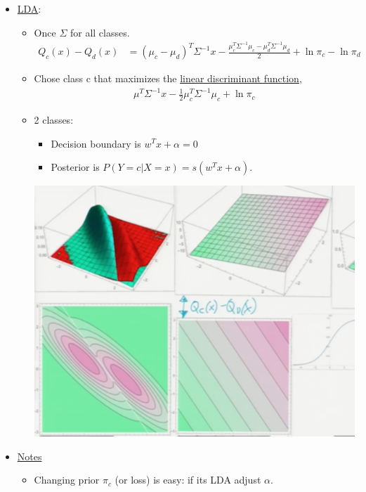 \documentclass[10pt]{article}
\begin{document}
\begin{description}
\begin{itemize}
				\item \underline{LDA}:
					\begin{itemize}
						\item Once $\Sigma$ for all classes.
							\begin{align*}
								Q_{c}(x) - Q_{d}(x) &= (\mu_{c} - \mu_{d})^{T} \Sigma^{-1}x - \frac{\mu_{c}^{T}\Sigma^{-1}\mu_{c} - \mu_{d}^{T}\Sigma^{-1}\mu_{d}}{2} + \ln \pi_{c} - \ln \pi_{d}
							\end{align*}
						\item Chose class c that maximizes the \underline{linear discriminant function},
							\begin{align*}
								\mu^{T}\Sigma^{-1}x - \frac{1}{2}\mu_{c}^{T}\Sigma^{-1}\mu_{c} + \ln \pi_{c}
							\end{align*}
						\item 2 classes:
							\begin{itemize}
								\item Decision boundary is $w^{T}x + \alpha = 0$
								\item Posterior is $P(Y=c|X=x) = s(w^{T}x + \alpha)$.
							\end{itemize}
							\begin{center}
								\includegraphics[scale=0.5]{images/LDA}
							\end{center}
					\end{itemize}
				\item \underline{Notes}
					\
					\begin{itemize}
						\item Changing prior $\pi_{c}$ (or loss) is easy: if its LDA adjust $\alpha$.

\end{itemize}
\end{itemize}
\end{description}
\end{document}
